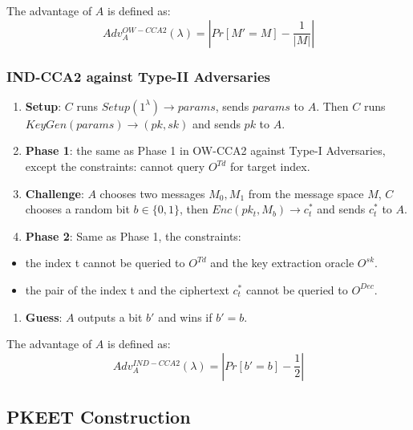 \documentclass[
]{article}
\providecommand{\tightlist}{%
  \setlength{\itemsep}{0pt}\setlength{\parskip}{0pt}}
\begin{document}
The advantage of \(A\) is defined as:
\[Adv_{A}^{OW-CCA2}(\lambda) = |Pr[M' = M] - \frac{1}{|M|}|\]

\hypertarget{ind-cca2-against-type-ii-adversaries}{%
\subsubsection{IND-CCA2 against Type-II
Adversaries}\label{ind-cca2-against-type-ii-adversaries}}

\begin{enumerate}
\def\labelenumi{\arabic{enumi}.}
\item
  \textbf{Setup}: \(C\) runs \(Setup(1^\lambda)\rightarrow params\),
  sends \(params\) to \(A\). Then \(C\) runs
  \(KeyGen(params) \rightarrow (pk, sk)\) and sends \(pk\) to \(A\).
\item
  \textbf{Phase 1}: the same as Phase 1 in OW-CCA2 against Type-I
  Adversaries, except the constraints: cannot query \(O^{Td}\) for
  target index.
\item
  \textbf{Challenge}: \(A\) chooses two messages \(M_0, M_1\) from the
  message space \(M\), \(C\) chooses a random bit \(b \in \{0, 1\}\),
  then \(Enc(pk_{t}, M_b) \rightarrow c_{t}^*\) and sends \(c_{t}^*\) to
  \(A\).
\item
  \textbf{Phase 2}: Same as Phase 1, the constraints:
\end{enumerate}

\begin{itemize}
\tightlist
\item
  the index t cannot be queried to \(O^{Td}\) and the key extraction
  oracle \(O^{sk}\).
\item
  the pair of the index t and the ciphertext \(c_{t}^*\) cannot be
  queried to \(O^{Dec}\).
\end{itemize}

\begin{enumerate}
\def\labelenumi{\arabic{enumi}.}
\setcounter{enumi}{4}
\tightlist
\item
  \textbf{Guess}: \(A\) outputs a bit \(b'\) and wins if \(b' = b\).
\end{enumerate}

The advantage of \(A\) is defined as:
\[Adv_{A}^{IND-CCA2}(\lambda) = |Pr[b' = b] - \frac{1}{2}|\]

\hypertarget{pkeet-construction}{%
\subsection{PKEET Construction}\label{pkeet-construction}}
\end{document}
